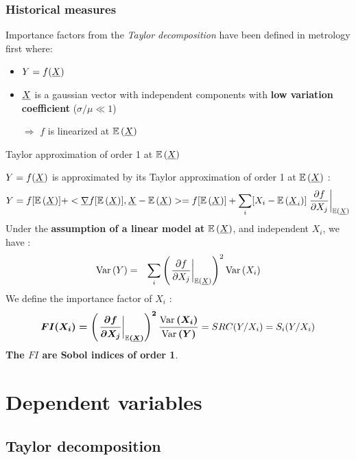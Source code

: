 \documentclass[8pt]{beamer}
\begin{document}
\begin{frame}
\frametitle{Historical measures}

\small
  Importance factors from the \emph{Taylor decomposition} have been defined in metrology first where:
  \begin{itemize}
  \item $Y=f({\underline{X}})$
   \item ${\underline{X}}$ is a gaussian vector with independent components with {\bf low variation coefficient} ($\sigma / \mu \ll 1$)
   \item[$\Longrightarrow$] $f$ is linearized at $\mathbb{E}\left( {\underline{X}} \right)$
  \end{itemize}


  \begin{block}{Taylor approximation of order 1 at $\mathbb{E}\left( {\underline{X}} \right)$}

$Y=f({\underline{X}})$ is approximated by its  \alert{ Taylor approximation of order 1 at $\mathbb{E}\left( {\underline{X}} \right)$ } :
\begin{equation}
Y = f[\mathbb{E}\left( {\underline{X}} \right)] + <{\underline{\nabla }}f[\mathbb{E}\left( {\underline{X}} \right)], {\underline{X}} - \mathbb{E}\left( {\underline{X}} \right)> =  f[\mathbb{E}\left( {\underline{X}} \right)] + \sum_i [X_i-\mathbb{E}\left( {\underline{X}}_i \right)]\left.\frac{\partial f}{\partial X_j}\right|_{\mathbb{E}\left( {\underline{X}} \right)}
\end{equation}
Under the  {\bf assumption of a linear model at} $\mathbb{E}\left( {\underline{X}} \right)$, and  \alert{independent $X_i$}, we have :
\begin{eqnarray}
\mbox{Var}\left( Y \right) & = & \sum_i \left(\left.\frac{\partial f}{\partial X_j}\right|_{\mathbb{E}\left( {\underline{X}} \right)}\right)^2 \mbox{Var}\left( X_i \right)
\end{eqnarray}
We define the  \alert{importance factor of $X_i$} :
$$
\boldsymbol{
FI(X_i) = \left(\left.\frac{\partial f}{\partial X_j}\right|_{\mathbb{E}\left( {\underline{X}} \right)}\right)^2 \frac{\mbox{Var}\left( X_i \right)}{\mbox{Var}\left( Y \right)}
} = SRC(Y / X_i) = S_i(Y/X_i)
$$
{\bf The $FI$ are Sobol indices of order 1}.
  
\end{block}

  \end{frame}





\section{Dependent variables}

\subsection{Taylor decomposition}
\end{document}
